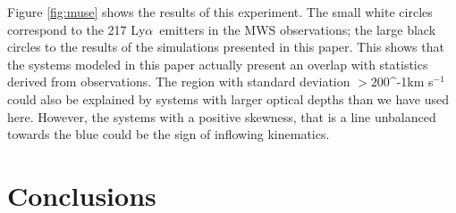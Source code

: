 \documentclass[a4paper,fleqn,usenatbib]{mnras}
\newcommand{\lya}{\ifmmode{{\rm Ly}\alpha}\else Ly$\alpha$\ \fi}
\newcommand{\kms}{\ifmmode\mathrm{km\ s}^{-1}\else km s$^{-1}$\fi}
\newcommand{\vrot}{\ifmmode v_{\mathrm{rot}}\else $v_{\mathrm{rot}}$~\fi}
\newcommand{\vout}{\ifmmode v_{\mathrm{out}}\else $v_{\mathrm{out}}$~\fi}
\newcommand{\tauh}{\ifmmode \tau_{\mathrm{H}}\else $\tau_{\mathrm{H}}$~\fi}
\begin{document}
Figure \ref{fig:muse} shows the results of this experiment. 
The small white circles correspond to the 217 \lya emitters in the MWS
observations; the large black circles to the results of the
simulations presented in this paper. 
This shows that the systems modeled in this paper actually present an
overlap with statistics derived from observations. 
The region with standard deviation $>200$\kms could also be explained
by systems with larger optical depths than we have used here. 
However, the systems with a positive skewness, that is a line
unbalanced towards the blue could be the sign of inflowing
kinematics. 





\section{Conclusions}
\label{sec:conclusions}
\end{document}
